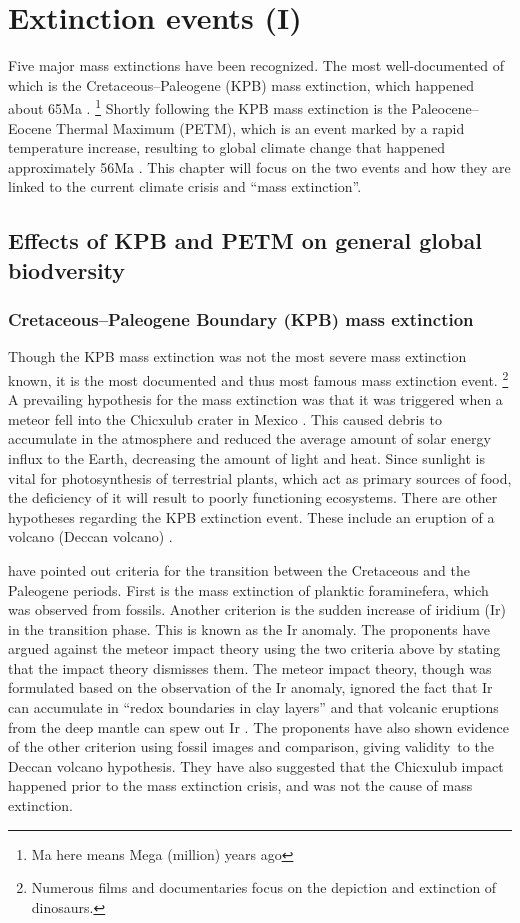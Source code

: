 \chapter{Extinction events (I)}

Five major mass extinctions have been recognized.
The most well-documented of which is the Cretaceous--Paleogene (KPB) mass extinction, which happened about 65Ma \cite[p.456]{biomain}.
\footnote{Ma here means Mega (million) years ago}
Shortly following the KPB mass extinction is the Paleocene--Eocene Thermal Maximum (PETM), which is an event marked by a rapid temperature increase, resulting to global climate change that happened approximately 56Ma \cite{Keller2018}.
This chapter will focus on the two events and how they are linked to the current climate crisis and ``mass extinction''.

\section{Effects of KPB and PETM on general global biodversity}
\subsection{Cretaceous--Paleogene Boundary (KPB) mass extinction}
Though the KPB mass extinction was not the most severe mass extinction known, it is the most documented and thus most famous mass extinction event.
\footnote{Numerous films and documentaries focus on the depiction and extinction of dinosaurs.}
A prevailing hypothesis for the mass extinction was that it was triggered when a meteor fell into the Chicxulub crater in Mexico \cite[p.456]{Keller2018, biomain}.
This caused debris to accumulate in the atmosphere and reduced the average amount of solar energy influx to the Earth, decreasing the amount of light and heat.
Since sunlight is vital for photosynthesis of terrestrial plants, which act as primary sources of food, the deficiency of it will result to poorly functioning ecosystems.
There are other hypotheses regarding the KPB extinction event.
These include an eruption of a volcano (Deccan volcano) \cite{Keller2018}.

 have pointed out criteria for the transition between the Cretaceous and the Paleogene periods.
First is the mass extinction of planktic foraminefera, which was observed from fossils.
Another criterion is the sudden increase of iridium (Ir) in the transition phase.
This is known as the Ir anomaly.
The proponents have argued against the meteor impact theory using the two criteria above by stating that the impact theory dismisses them.
The meteor impact theory, though was formulated based on the observation of the Ir anomaly, ignored the fact that Ir can accumulate in ``redox boundaries in clay layers'' and that volcanic eruptions from the deep mantle can spew out Ir \cite{Keller2018}.
The proponents have also shown evidence of the other criterion using fossil images and comparison, giving validity\footnotemark\ to the Deccan volcano hypothesis.
They have also suggested that the Chicxulub impact happened prior to the mass extinction crisis, and was not the cause of mass extinction.

